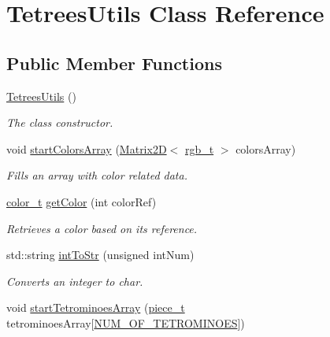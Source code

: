 \hypertarget{classTetreesUtils}{}\section{Tetrees\+Utils Class Reference}
\label{classTetreesUtils}
\subsection*{Public Member Functions}
\begin{DoxyCompactItemize}
\item 
\mbox{\label{classTetreesUtils_a877e9b03752855651aced77c6e888c55}} 
\hyperlink{classTetreesUtils_a877e9b03752855651aced77c6e888c55}{Tetrees\+Utils} ()
\begin{DoxyCompactList}\small\item\em The class constructor. \end{DoxyCompactList}\item 
void \hyperlink{classTetreesUtils_afaeab256a68024309eefbbdfae158397}{start\+Colors\+Array} (\hyperlink{classMatrix2D}{Matrix2D}$<$ \hyperlink{structrgb__t}{rgb\+\_\+t} $>$ colors\+Array)
\begin{DoxyCompactList}\small\item\em Fills an array with color related data. \end{DoxyCompactList}\item 
\hyperlink{TetreesDefs_8hpp_a8ba5fbce2446135735693ab60c896bbd}{color\+\_\+t} \hyperlink{classTetreesUtils_a812d9a7bee07fef5dfcec1fd36c4b502}{get\+Color} (int color\+Ref)
\begin{DoxyCompactList}\small\item\em Retrieves a color based on its reference. \end{DoxyCompactList}\item 
std\+::string \hyperlink{classTetreesUtils_ad6ece1c845969a3535b8a6d971d8ddcb}{int\+To\+Str} (unsigned int\+Num)
\begin{DoxyCompactList}\small\item\em Converts an integer to char. \end{DoxyCompactList}\item 
void \hyperlink{classTetreesUtils_acb377319f6772d9e88f677273c895912}{start\+Tetrominoes\+Array} (\hyperlink{structpiece__t}{piece\+\_\+t} tetrominoes\+Array\mbox{[}\hyperlink{TetreesDefs_8hpp_a69fa4aa1afe74f7f9ec42bf1e07ddf28}{N\+U\+M\+\_\+\+O\+F\+\_\+\+T\+E\+T\+R\+O\+M\+I\+N\+O\+ES}\mbox{]})

\end{DoxyCompactItemize}
